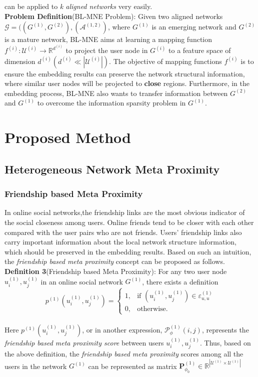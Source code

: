 \documentclass{article}
\begin{document}
can be applied to \emph{k aligned networks} very easily.\\
\textbf{Problem Definition}(BL-MNE Problem): Given two aligned networks $\mathcal{G}=((G^{(1)}, G^{(2)}), (\mathcal{A}^{(1,2)})$, where $G^{(1)}$ is an emerging network and $G^{(2)}$ is a mature network, BL-MNE aims at learning a mapping function $f^{(i)}: \mathcal{U}^{(i)}\rightarrow \mathbb{R}^{d^{(i)}}$ to project the user node in $G^{(i)}$ to a feature space of dimension $d^{(i)}(d^{(i)}\ll|\mathcal{U}^{(i)}|)$. The objective of mapping functions $f^{(i)}$ is to ensure the embedding results can preserve the network structural information, where similar user nodes will be projected to \textbf{close} regions. Furthermore, in the embedding process, BL-MNE also wants to transfer information between $G^{(2)}$ and $G^{(1)}$ to overcome the information sparsity problem in $G^{(1)}$.

\section{Proposed Method} 
\subsection{Heterogeneous Network Meta Proximity}
\subsubsection{Friendship based Meta Proximity}
In online social networks,the friendship links are the most obvious indicator of the social
closeness among users. Online friends tend to be closer with each
other compared with the user pairs who are not friends. Users’
friendship links also carry important information about the local
network structure information, which should be preserved in the
embedding results. Based on such an intuition, the
\emph{friendship based meta proximity} concept can be proposed as follows.\\
\textbf{Definition 3}(Friendship based Meta Proximity): For any two user node $u_{i}^{(1)}, u_{j}^{(1)}$ in an online social network $G^{(1)}$, there exists a definition\\
$$ p^{(1)}(u_{i}^{(1)}, u_{j}^{(1)}) =
\begin{cases}
  1, & \mbox{if } (u_{i}^{(1)}, u_{j}^{(1)})\in \varepsilon_{u,u}^{(1)} \\
  0, & \mbox{otherwise}.
\end{cases}$$\\
\indent Here $p^{(1)}(u_{i}^{(1)}, u_{j}^{(1)})$, or in another expression, $\mathcal{P}_{\phi}^{(1)}(i,j)$, represents the \emph{friendship based meta proximity score} between users $u_{i}^{(1)}, u_{j}^{(1)}$. Thus, based on the above definition, the \emph{friendship based meta proximity} scores among all the users in the network $G^{(1)}$ can be represented as matrix $\mathbf{P}_{\phi_{0}}^{(1)}\in \mathbb{R}^{|\mathcal{U}^{(1)}\times \mathcal{U}^{(1)}|}$
\indent
\end{document}
